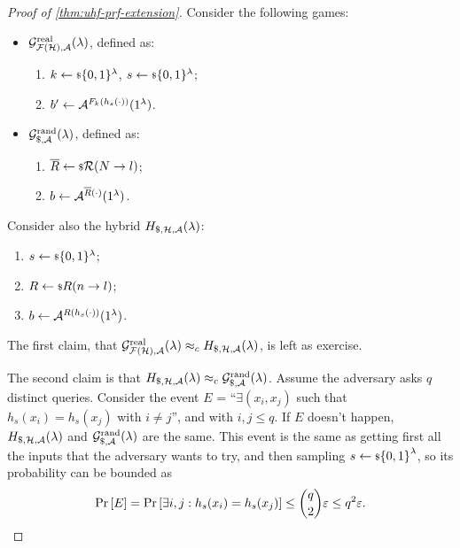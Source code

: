 \begin{proof}[Proof of \cref{thm:uhf-prf-extension}]
	Consider the following games:
	\begin{itemize}
		\item $\UHFGameReal(\lambda)$, defined as:
		\begin{enumerate}
			\item $k \rand{\{0,1\}^{\lambda}}$, $s \rand{\{0,1\}^{\lambda}}$;
			\item $b' \from \Adv^{F_k(h_s(\cdot))} (1^{\lambda})$.
		\end{enumerate}
		\item $\UHFGameRand(\lambda)$, defined as:
		\begin{enumerate}
			\item $\overline{R} \rand{\R(N \to l)}$;
			\item $b \from \Adv^{\overline{R}(\cdot)} (1^{\lambda})$.
		\end{enumerate}
	\end{itemize}

	Consider also the hybrid $\UHFGameHybrid(\lambda)$:
	\begin{enumerate}
		\item $s \rand{\{0,1\}^{\lambda}}$;
		\item $R \rand{R(n \to l)}$;
		\item $b \from \Adv^{R(h_s(\cdot))} (1^{\lambda})$.
	\end{enumerate}

	The first claim, \ie that $\UHFGameReal(\lambda) \CompInd \UHFGameHybrid(\lambda)$, is left as exercise.

	The second claim is that $\UHFGameHybrid(\lambda) \CompInd \UHFGameRand(\lambda)$.
	Assume the adversary asks $q$ distinct queries.
	Consider the event $E$ = ``$\exists (x_i, x_j)$ such that $h_s(x_i) = h_s(x_j)$ with $i \neq j$'', and with $i,j \le q$. 
	If $E$ doesn't happen, $\UHFGameHybrid(\lambda)$ and $\UHFGameRand(\lambda)$ are the same.
	This event is the same as getting first all the inputs that the adversary wants to try, and then sampling $s \rand{\{0,1\}}^{\lambda}$, so its probability can be bounded as
	\begin{equation*}
		\Pr{E} = \Pr{\exists i,j : h_s(x_i) = h_s(x_j)} \le \binom{q}{2} \epsilon \le q^2 \epsilon. \qedhere
	\end{equation*}
\end{proof}

